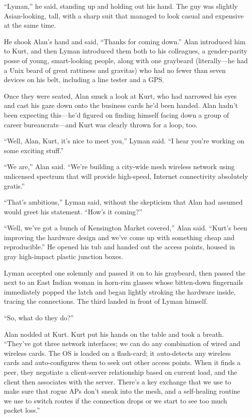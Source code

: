``Lyman,'' he said, standing up and holding out his hand.  The guy was
slightly Asian-looking, tall, with a sharp suit that managed to look
casual and expensive at the same time.

He shook Alan's hand and said, ``Thanks for coming down.'' Alan
introduced him to Kurt, and then Lyman introduced them both to his
colleagues, a gender-parity posse of young, smart-looking people,
along with one graybeard (literally---he had a Unix beard of great
rattiness and gravitas) who had no fewer than seven devices on his
belt, including a line tester and a GPS.

Once they were seated, Alan snuck a look at Kurt, who had narrowed his
eyes and cast his gaze down onto the business cards he'd been handed. 
Alan hadn't been expecting this---he'd figured on finding himself
facing down a group of career bureaucrats---and Kurt was clearly
thrown for a loop, too.

``Well, Alan, Kurt, it's nice to meet you,'' Lyman said.  ``I hear
you're working on some exciting stuff.''

``We are,'' Alan said.  ``We're building a city-wide mesh wireless
network using unlicensed spectrum that will provide high-speed,
Internet connectivity absolutely gratis.''

``That's ambitious,'' Lyman said, without the skepticism that Alan had
assumed would greet his statement.  ``How's it coming?''

``Well, we've got a bunch of Kensington Market covered,'' Alan said. 
``Kurt's been improving the hardware design and we've come up with
something cheap and reproducible.'' He opened his tub and handed out
the access points, housed in gray high-impact plastic junction boxes.

Lyman accepted one solemnly and passed it on to his graybeard, then
passed the next to an East Indian woman in horn-rim glasses whose
bitten-down fingernails immediately popped the latch and began lightly
stroking the hardware inside, tracing the connections.  The third
landed in front of Lyman himself.

``So, what do they do?''

Alan nodded at Kurt.  Kurt put his hands on the table and took a
breath.  ``They've got three network interfaces; we can do any
combination of wired and wireless cards.  The OS is loaded on a
flash-card; it auto-detects any wireless cards and auto-configures
them to seek out other access points.  When it finds a peer, they
negotiate a client-server relationship based on current load, and the
client then associates with the server.  There's a key exchange that
we use to make sure that rogue APs don't sneak into the mesh, and a
self-healing routine we use to switch routes if the connection drops
or we start to see too much packet loss.''

